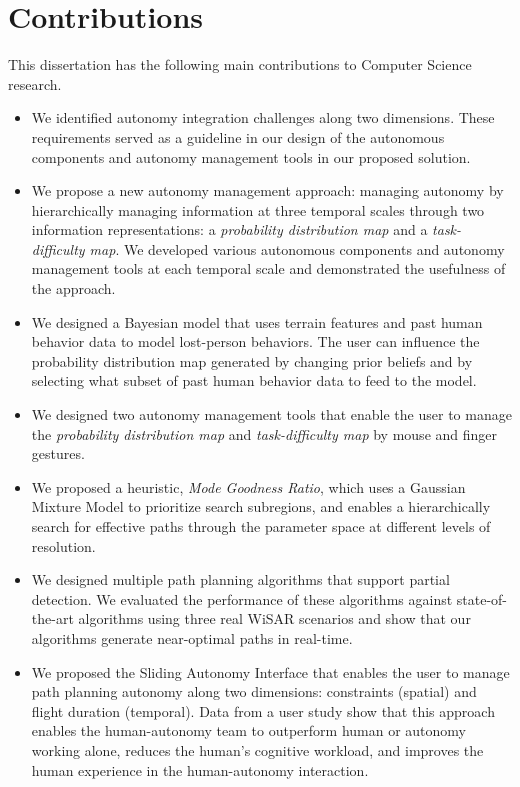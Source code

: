 \section{Contributions}
\label{contributions}

This dissertation has the following main contributions to Computer Science research.

\begin{itemize}
\item We identified autonomy integration challenges along two dimensions. These requirements served as a guideline in our design of the autonomous components and autonomy management tools in our proposed solution.
\item We propose a new autonomy management approach: managing autonomy by hierarchically managing information at three temporal scales through two information representations: a \textit{probability distribution map} and a \textit{task-difficulty map}. We developed various autonomous components and autonomy management tools at each temporal scale and demonstrated the usefulness of the approach.
\item We designed a Bayesian model that uses terrain features and past human behavior data to model lost-person behaviors. The user can influence the probability distribution map generated by changing prior beliefs and by selecting what subset of past human behavior data to feed to the model.
\item We designed two autonomy management tools that enable the user to manage the \textit{probability distribution map} and \textit{task-difficulty map} by mouse and finger gestures.
\item We proposed a heuristic, \textit{Mode Goodness Ratio}, which uses a Gaussian Mixture Model to prioritize search subregions, and enables a hierarchically search for effective paths through the parameter space at different levels of resolution.
\item We designed multiple path planning algorithms that support partial detection. We evaluated the performance of these algorithms against state-of-the-art algorithms using three real WiSAR scenarios and show that our algorithms generate near-optimal paths in real-time.
\item We proposed the Sliding Autonomy Interface that enables the user to manage path planning autonomy along two dimensions: constraints (spatial) and flight duration (temporal). Data from a user study show that this approach enables the human-autonomy team to outperform human or autonomy working alone, reduces the human's cognitive workload, and improves the human experience in the human-autonomy interaction.
\end{itemize}

